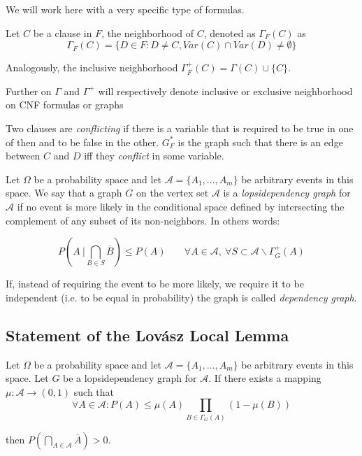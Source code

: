We will work here with a very specific type of formulas.
\begin{definition}
	Let $C$ be a clause in $F$, the neighborhood of $C$, denoted as $\Gamma_F(C)$ as 
	$$ \Gamma_F(C) = \{ D \in F : D\ne C, Var(C) \cap Var(D) \ne \emptyset\}$$
	
	Analogously, the inclusive neighborhood $\Gamma_F^+(C) = \Gamma(C) \cup \{C\}$. 
\end{definition}


Further on $\Gamma$ and $\Gamma^+$ will respectively denote inclusive or exclusive neighborhood on CNF formulas or graphs


\begin{definition}
	
	Two clauses are \emph{conflicting} if there is a variable that is required to be true in one of then and to be false in the other. $G_F^*$ is the graph such that there is an edge between $C$ and $D$ iff they \emph{conflict} in some variable.
	
\end{definition}
	



\begin{definition} Let $\Omega$ be a probability space and let 
$\mathcal{A} = \{A_1,...,A_m\}$ be arbitrary events in this space. We say that a graph $G$ on the vertex set $\mathcal{A}$ is a \emph{lopsidependency graph }for $\mathcal{A}$ if no event is more likely in the conditional space defined by intersecting the complement of any subset of its non-neighbors. In others words:

\[
 P\left(  A\ \Big | \bigcap_{B\in S} \overline{B} \right ) \le P(A) \ \ \ \ \quad \forall A \in \mathcal{A},\ \forall S \subset \mathcal{A} \backslash\Gamma_G^+(A) 
\]


If, instead of requiring the event to be more likely, we require it to be independent (i.e. to be equal in probability) the graph is called \emph{dependency graph}.

\end{definition}

\subsection{Statement of the Lovász Local Lemma}

\begin{theorem}\label{LLL}
	Let $\Omega$ be a probability space and let 
$\mathcal{A} = \{A_1,...,A_m\}$ be arbitrary events in this space. Let $G$ be a lopsidependency graph for $\mathcal{A}$. If there exists a mapping $\mu:\mathcal{A} \to (0,1)$ such that 
$$
\forall A \in \mathcal{A} : P (A) \le \mu(A) \prod_{B\in\Gamma_G(A)} (1-\mu(B))
$$

then $P\left ( \bigcap_{A\in \mathcal{A}} \overline{A}\right ) > 0$.\\
\end{theorem}

